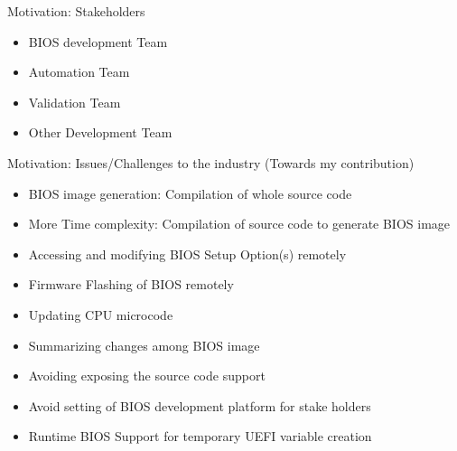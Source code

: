 \begin{frame}{Motivation: Stakeholders}
    \begin{itemize}
        \item BIOS development Team
        \item Automation Team
        \item Validation Team
        \item Other Development Team
    \end{itemize}
\end{frame}

\begin{frame}{Motivation: Issues/Challenges to the industry (Towards my contribution)}
    \begin{itemize}
        \item BIOS image generation: Compilation of whole source code
        \item More Time complexity: Compilation of source code to generate BIOS image
        \item Accessing and modifying BIOS Setup Option(s) remotely
        \item Firmware Flashing of BIOS remotely
        \item Updating CPU microcode
        \item Summarizing changes among BIOS image
        \item Avoiding exposing the source code support
        \item Avoid setting of BIOS development platform for stake holders
        \item Runtime BIOS Support for temporary UEFI variable creation
    \end{itemize}
\end{frame}